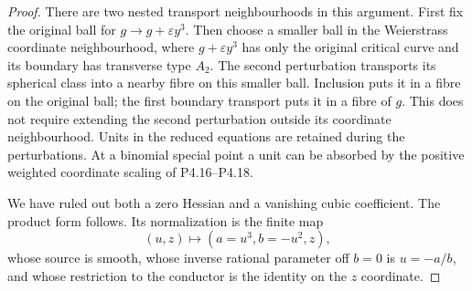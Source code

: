 \begin{proof}
There are two nested transport
neighbourhoods in this argument.
First fix the original ball for
$g\to g+\varepsilon y^3$.
Then choose a smaller ball in the
Weierstrass coordinate neighbourhood,
where $g+\varepsilon y^3$ has only
the original critical curve and its
boundary has transverse type $A_2$.
The second perturbation transports
its spherical class into a nearby
fibre on this smaller ball. Inclusion
puts it in a fibre on the original
ball; the first boundary transport
puts it in a fibre of $g$.
This does not require extending the
second perturbation outside its
coordinate neighbourhood.
Units in the reduced equations are
retained during the perturbations.
At a binomial special point a unit
can be absorbed by the positive
weighted coordinate scaling of
P4.16--P4.18.

We have ruled out both a zero
Hessian and a vanishing cubic
coefficient. The product form
follows. Its normalization is
the finite map
\[
 (u,z)\longmapsto (a=u^3,b=-u^2,z),
\]
whose source is smooth, whose
inverse rational parameter off
$b=0$ is $u=-a/b$, and whose
restriction to the conductor is
the identity on the $z$ coordinate.
\end{proof}

